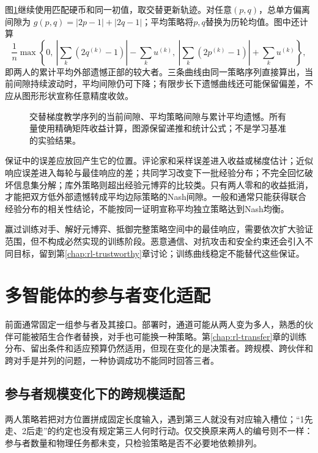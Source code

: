 图\ref{fig:rl-multi-agent-stability}继续使用匹配硬币和同一初值，取交替更新轨迹。对任意$(p,q)$，总单方偏离间隙为
$g(p,q)=|2p-1|+|2q-1|$；平均策略将$p,q$替换为历轮均值。图中还计算
\[
 \frac1n\max\!\left\{0,\
 \left|\sum_k(2q^{(k)}-1)\right|-\sum_k u^{(k)},\
 \left|\sum_k(2p^{(k)}-1)\right|+\sum_k u^{(k)}\right\},
\]
即两人的累计平均外部遗憾正部的较大者。三条曲线由同一策略序列直接算出，当前间隙持续波动时，平均间隙仍可下降；有限步长下遗憾曲线还可能保留偏差，不应从图形形状宣称任意精度收敛。

\begin{figure}[htbp]
 \centering
 
 \caption{交替梯度教学序列的当前间隙、平均策略间隙与累计平均遗憾。所有量使用精确矩阵收益计算，图源保留递推和统计公式；不是学习基准的实验结果。}
 \label{fig:rl-multi-agent-stability}
\end{figure}

保证中的误差应放回产生它的位置。评论家和采样误差进入收益或梯度估计；近似响应误差进入每轮与最佳响应的差；共同学习改变下一批经验分布；不完全回忆破坏信息集分解；库外策略则超出经验元博弈的比较类。只有两人零和的收益抵消，才能把双方低外部遗憾转成平均边际策略的Nash间隙。一般和通常只能获得联合经验分布的相关性结论，不能按同一证明宣称平均独立策略达到Nash均衡。

赢过训练对手、解好元博弈、抵御完整策略空间中的最佳响应，需要依次扩大验证范围，但不构成必然实现的训练阶段。恶意通信、对抗攻击和安全约束还会引入不同目标，留到第\ref{chap:rl-trustworthy}章讨论；训练曲线稳定不能替代这些保证。

\section{多智能体的参与者变化适配}
\label{sec:rl-multi-agent-adaptation}

前面通常固定一组参与者及其接口。部署时，通道可能从两人变为多人，熟悉的伙伴可能被陌生合作者替换，对手也可能换一种策略。第\ref{chap:rl-transfer}章的训练分布、留出条件和适应预算仍然适用，但现在变化的是决策者。跨规模、跨伙伴和跨对手是并列的问题，一种协调成功不能同时回答三者。

\subsection{参与者规模变化下的跨规模适配}
\label{sec:rl-multi-agent-scale}

两人策略若把对方位置拼成固定长度输入，遇到第三人就没有对应输入槽位；“1先走、2后走”的约定也没有规定第三人何时行动。仅交换原来两人的编号则不一样：参与者数量和物理任务都未变，只检验策略是否不必要地依赖排列。

